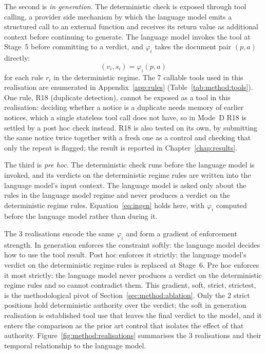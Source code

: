 The second is \emph{in generation}. The deterministic check is exposed through tool calling, a provider side mechanism by which the language model emits a structured call to an external function and receives its return value as additional context before continuing to generate. The language model invokes the tool at Stage~5 before committing to a verdict, and $\varphi_i$ takes the document pair $(p, a)$ directly:
%
\begin{equation}\label{eq:ingen}
  (v_i, s_i) = \varphi_i(p, a)
\end{equation}
%
for each rule $r_i$ in the deterministic regime. The 7 callable tools used in this realisation are enumerated in Appendix~\ref{app:rules} (Table~\ref{tab:method:tools}). One rule, R18 (duplicate detection), cannot be exposed as a tool in this realisation: deciding whether a notice is a duplicate needs memory of earlier notices, which a single stateless tool call does not have, so in Mode~D R18 is settled by a post hoc check instead. R18 is also tested on its own, by submitting the same notice twice together with a fresh one as a control and checking that only the repeat is flagged; the result is reported in Chapter~\ref{chap:results}.

The third is \emph{pre hoc}. The deterministic check runs before the language model is invoked, and its verdicts on the deterministic regime rules are written into the language model's input context. The language model is asked only about the rules in the language model regime and never produces a verdict on the deterministic regime rules. Equation~\eqref{eq:ingen} holds here, with $\varphi_i$ computed before the language model rather than during it.

The 3 realisations encode the same $\varphi_i$ and form a gradient of enforcement strength. In generation enforces the constraint softly: the language model decides how to use the tool result. Post hoc enforces it strictly: the language model's verdict on the deterministic regime rules is replaced at Stage~6. Pre hoc enforces it most strictly: the language model never produces a verdict on the deterministic regime rules and so cannot contradict them. This gradient, soft, strict, strictest, is the methodological pivot of Section~\ref{sec:method:ablation}. Only the 2 strict positions hold deterministic authority over the verdict; the soft in generation realisation is established tool use \citep{schick2024,goodell2025} that leaves the final verdict to the model, and it enters the comparison as the prior art control that isolates the effect of that authority. Figure~\ref{fig:method:realisations} summarises the 3 realisations and their temporal relationship to the language model.

